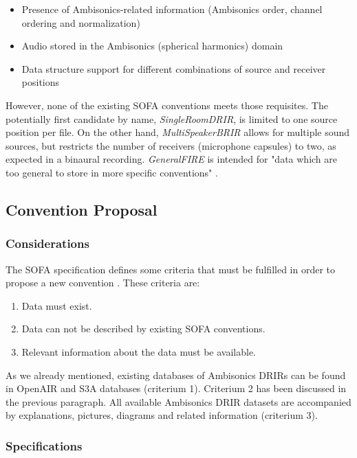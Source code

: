 \begin{itemize}
    \item Presence of Ambisonics-related information (Ambisonics order, channel ordering and normalization)
    \item Audio stored in the Ambisonics (spherical harmonics) domain  
    \item Data structure support for different combinations of source and receiver positions
\end{itemize}


However, none of the existing SOFA conventions meets those requisites. The potentially first candidate by name, \textit{SingleRoomDRIR}, is limited to one source position per file. On the other hand, \textit{MultiSpeakerBRIR} allows for multiple sound sources, but restricts the number of receivers (microphone capsules) to two, as expected in a binaural recording. \textit{GeneralFIRE} is intended for "data which are too general to store in more specific conventions" \cite{generalfire}.


\subsection{Convention Proposal}

\subsubsection{Considerations}

The SOFA specification defines some criteria that must be fulfilled in order to propose a new convention \cite{sofaconventions}. These criteria are:
\begin{enumerate}
    \item Data must exist.
    \item Data can not be described by existing SOFA conventions.
    \item Relevant information about the data must be available.
\end{enumerate}


As we already mentioned, existing databases of Ambisonics DRIRs can be found in OpenAIR and S3A databases (criterium 1). Criterium 2 has been discussed in the previous paragraph. All available Ambisonics DRIR datasets are accompanied by explanations, pictures, diagrams and related information (criterium 3). 

\subsubsection{Specifications}

